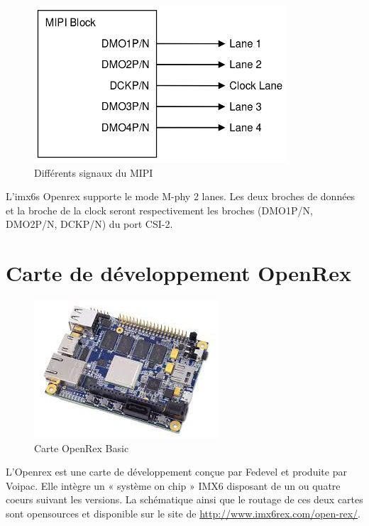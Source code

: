 \begin{figure}[!htb]
    \centering
    \includegraphics[trim={0cm 0cm 0cm 0cm},clip,scale=0.4]{Figures/blockMIPI.png}
    \decoRule
    \caption{Différents signaux du MIPI} \label{fig:blockmipi}
\end{figure}

L’imx6s Openrex supporte le mode M-phy 2 lanes. Les deux broches de données et la
broche de la clock seront respectivement les broches (DMO1P/N, DMO2P/N, DCKP/N) du
port CSI-2.

\section{Carte de développement OpenRex}

\begin{figure}[!htb]
    \centering
    \includegraphics[trim={0cm 0cm 0cm 0cm},clip,scale=0.55]{Figures/openrex.png}
    \decoRule
    \caption{Carte OpenRex Basic} \label{fig:openrex}
\end{figure}

L’Openrex est une carte de développement conçue par Fedevel et produite par Voipac.
Elle intègre un « système on chip » IMX6 disposant de un ou quatre coeurs suivant les
versions. La schématique ainsi que le routage de ces deux cartes sont opensources et
disponible sur le site de \href{http://www.imx6rex.com/open-rex/}{http://www.imx6rex.com/open-rex/}.


